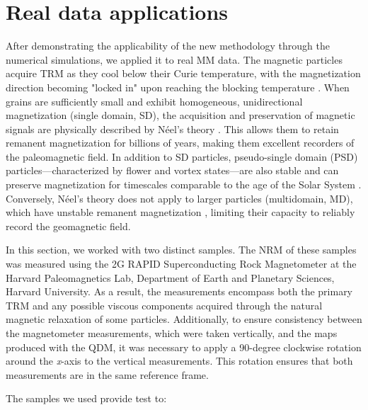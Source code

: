 \section{Real data applications}

After demonstrating the applicability of the new methodology through the numerical simulations, we applied it to real MM data. The magnetic particles \citep[most commonly magnetite,][]{OReilly1984} acquire TRM as they cool below their Curie temperature, with the magnetization direction becoming "locked in" upon reaching the blocking temperature \citep{Dunlop1997}. When grains are sufficiently small and exhibit homogeneous, unidirectional magnetization (single domain, SD), the acquisition and preservation of magnetic signals are physically described by Néel’s theory \citep{Neel1949, Neel1955}. This allows them to retain remanent magnetization for billions of years, making them excellent recorders of the paleomagnetic field. In addition to SD particles, pseudo-single domain (PSD) particles—characterized by flower and vortex states—are also stable and can preserve magnetization for timescales comparable to the age of the Solar System \citep{Nagy2017, Lascu2018,Bellon-2024a}. Conversely, Néel’s theory does not apply to larger particles (multidomain, MD), which have unstable remanent magnetization \citep[e.g., due to viscous domain reorganization,][]{DeGroot2014}, limiting their capacity to reliably record the geomagnetic field. 

In this section, we worked with two distinct samples. The NRM of these samples was measured using the 2G RAPID Superconducting Rock Magnetometer at the Harvard Paleomagnetics Lab, Department of Earth and Planetary Sciences, Harvard University. As a result, the measurements encompass both the primary TRM and any possible viscous components acquired through the natural magnetic relaxation of some particles. Additionally, to ensure consistency between the magnetometer measurements, which were taken vertically, and the maps produced with the QDM, it was necessary to apply a 90-degree clockwise rotation around the \textit{x}-axis to the vertical measurements. This rotation ensures that both measurements are in the same reference frame.

The samples we used provide test to:

